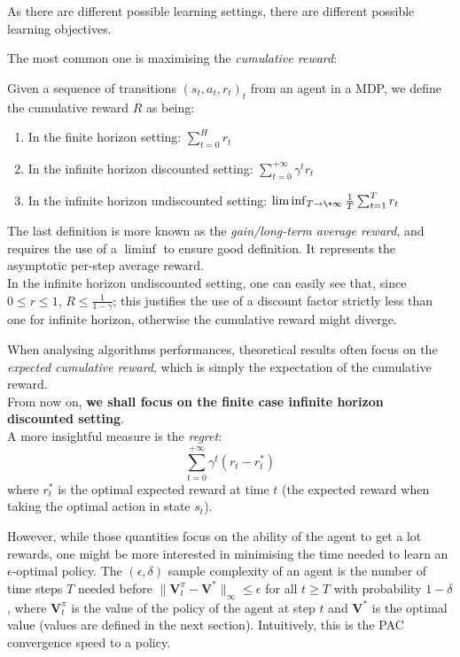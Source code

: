 As there are different possible learning settings, there are different possible learning objectives.

The most common one is maximising the \emph{cumulative reward}:

\begin{defi}
  Given a sequence of transitions $(s_t, a_t, r_t)_t$ from an agent in a MDP, we define the cumulative reward $R$ as being:
  \begin{enumerate}
  \item In the finite horizon setting: $\sum_{t=0}^{H}r_t$
  \item In the infinite horizon discounted setting: $\sum_{t=0}^{+\infty} \gamma^t r_t$
  \item In the infinite horizon undiscounted setting: $\liminf_{T \to \+\infty} \frac{1}{T}\sum_{t=1}^{T} r_t$
  \end{enumerate}
  The last definition is more known as the \emph{gain/long-term average reward}, and requires the use of a $\liminf$ to ensure good definition. It represents the asymptotic per-step average reward.\\
  In the infinite horizon undiscounted setting, one can easily see that, since $0 \leq r \leq 1$, $R \leq \frac{1}{1 - \gamma}$; this justifies the use of a discount factor strictly less than one for infinite horizon, otherwise the cumulative reward might diverge.
\end{defi}

When analysing algorithms performances, theoretical results often focus on the \emph{expected cumulative reward}, which is simply the expectation of the cumulative reward.\\[1.5\lineskip]

From now on, \textbf{we shall focus on the finite case infinite horizon discounted setting}.\\[1.5\lineskip]

A more insightful measure is the \emph{regret}: $$\sum_{t=0}^{+\infty} \gamma^t(r_t - r_t^*)$$where $r_t^*$ is the optimal expected reward at time $t$ (the expected reward when taking the optimal action in state $s_t$).

However, while those quantities focus on the ability of the agent to get a lot rewards, one might be more interested in minimising the time needed to learn an $\epsilon$-optimal policy. The $(\epsilon, \delta)$ sample complexity of an agent is the number of time steps $T$ needed before $\| \mathbf{V}_t^\pi - \mathbf{V}^* \|_\infty \leq \epsilon$ for all $t \geq T$ with probability $1 - \delta$, where $\mathbf{V}_t^\pi$ is the value of the policy of the agent at step $t$ and $\mathbf{V}^*$ is the optimal value (values are defined in the next section). Intuitively, this is the PAC convergence speed to a policy.

